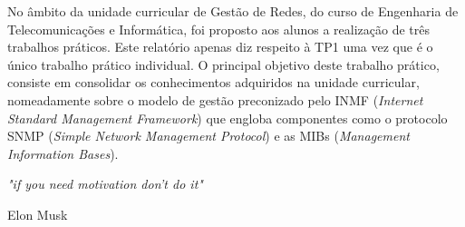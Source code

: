 \documentclass[../momento_1.tex]{subfiles}
\begin{document}
\par No âmbito da unidade curricular de Gestão de Redes, do curso de Engenharia de Telecomunicações e Informática, foi proposto aos alunos a realização de três trabalhos práticos. Este relatório apenas diz respeito à TP1 uma vez que é o único trabalho prático individual.
O principal objetivo deste trabalho prático, consiste em consolidar os conhecimentos adquiridos na unidade curricular, nomeadamente sobre o modelo de gestão preconizado pelo INMF (\textit{Internet Standard Management Framework}) que engloba componentes como o protocolo SNMP (\textit{Simple Network Management Protocol}) e as MIBs (\textit{Management Information Bases}).\par 

 
\setlength{\epigraphwidth}{4in} 
\epigraph{\textit{"if you need motivation don't do it"}}{Elon Musk}
\end{document}
